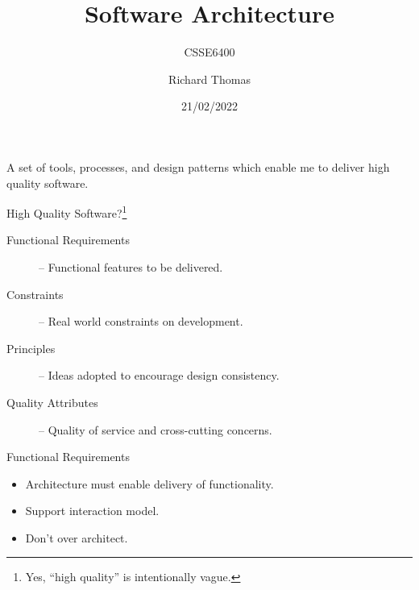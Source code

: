 \documentclass{slide}
\title{Software Architecture}
\subtitle{CSSE6400}
\institute{University of Queensland}
\author{Richard Thomas}
\date{21/02/2022}
\begin{document}
\maketitle







%
{A set of tools, processes, and design patterns which enable me to deliver high quality software.}


\begin{frame}{High Quality Software?\footnote{Yes, ``high quality'' is intentionally vague.}}

\Large{
\begin{description}
    \item[Functional Requirements] -- Functional features to be delivered.
    \item[Constraints] -- Real world constraints on development.
    \item[Principles] -- Ideas adopted to encourage design consistency.
    \item[Quality Attributes] -- Quality of service and cross-cutting concerns.
\end{description}
}

\end{frame}


\begin{frame}{Functional Requirements}

\Large{
\begin{itemize}
    \item Architecture must enable delivery of functionality.
    \item Support interaction model.
    \item Don't over architect.
\end{itemize}
}

\end{frame}
\end{document}
